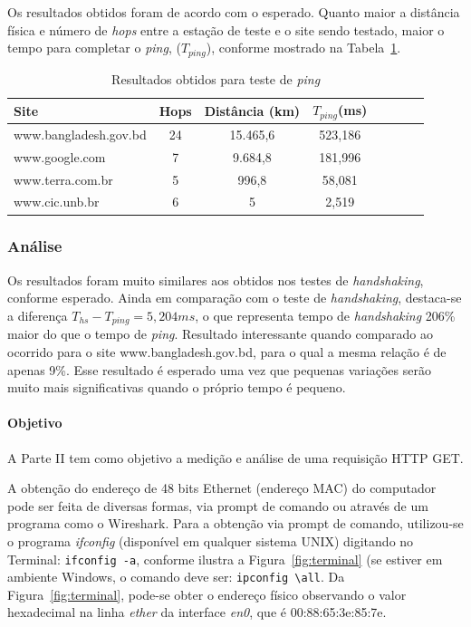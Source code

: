 \documentclass[12pt,a4paper]{report}
\begin{document}
Os resultados obtidos foram de acordo com o esperado. Quanto maior a distância física e número de \textit{hops} entre a estação de teste e o site sendo testado, maior o tempo para completar o \textit{ping}, (\(T_{ping}\)), conforme mostrado na Tabela~\ref{tab:resultsping}.

\begin{table}[h]
	\center
	\begin{tabular}{l*{6}{c}r}
	Site						& Hops	& Distância (km)	& \(T_{ping}\)(ms)\\
	\hline
	www.bangladesh.gov.bd		& 24		& 15.465,6		& 523,186\\
	www.google.com			& 7		& 9.684,8			& 181,996\\
	www.terra.com.br			& 5		& 996,8			& 58,081\\
	www.cic.unb.br				& 6		& 5				& 2,519\\
	\end{tabular}
	\caption{Resultados obtidos para teste de \textit{ping}}
	\label{tab:resultsping}
\end{table}

\subsubsection*{Análise}

Os resultados foram muito similares aos obtidos nos testes de \textit{handshaking}, conforme esperado. Ainda em comparação com o teste de \textit{handshaking}, destaca-se a diferença \(T_{hs} - T_{ping} = 5,204 ms\), o que representa tempo de \textit{handshaking} 206\% maior do que o tempo de \textit{ping}. Resultado interessante quando comparado ao ocorrido para o site www.bangladesh.gov.bd, para o qual a mesma relação é de apenas 9\%. Esse resultado é esperado uma vez que pequenas variações serão muito mais significativas quando o próprio tempo é pequeno.

\paragraph{Objetivo} A Parte II tem como objetivo a medição e análise de uma requisição HTTP GET.

A obtenção do endereço de 48 bits Ethernet (endereço MAC) do computador pode ser feita de diversas formas, via prompt de comando ou através de um programa como o Wireshark. Para a obtenção via prompt de comando, utilizou-se o programa \emph{ifconfig} (disponível em qualquer sistema UNIX) digitando no Terminal: \texttt{ifconfig -a}, conforme ilustra a Figura~\ref{fig:terminal} (se estiver em ambiente Windows, o comando deve ser: \texttt{ipconfig \textbackslash{}all}. Da Figura~\ref{fig:terminal}, pode-se obter o endereço físico observando o valor hexadecimal na linha \textit{ether} da interface \textit{en0}, que é 00:88:65:3e:85:7e.
\end{document}
